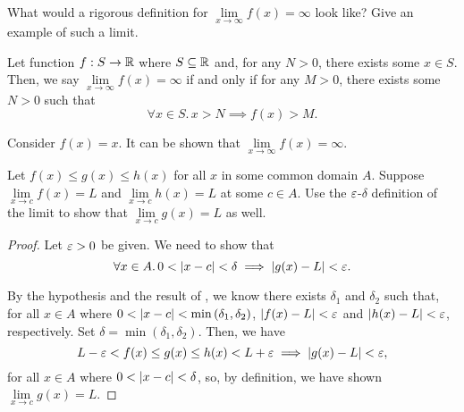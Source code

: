 \begin{problem}
  What would a rigorous definition for 
  $\lim\limits_{x \to \infty} f(x) = \infty$ look like? 
  Give an example of such a limit.

  \begin{definition}
    \label{def:limit-to-infty-x-to-infinite}
    Let function $f : S \to \mathbb{R}$ where $S \subseteq \mathbb{R}$ and, for any $N > 0$, there 
    exists some $x \in S$.
    Then, we say $\lim\limits_{x \to \infty} f(x) = \infty$ if and only if for any
    $M > 0$, there exists some $N > 0$ such that
    \[
      \forall x \in S.\, x > N \implies f(x) > M.
    \]
  \end{definition}

  Consider $f(x) = x$. It can be shown that $\lim\limits_{x \to \infty} f(x) = \infty$.

\end{problem}

\begin{problem}
  \label{prob:squeeze-theorem}
  Let $f(x) \leq g(x) \leq h(x)$ for all $x$ in some common domain $A$. Suppose $\lim\limits_{x \to c} f(x) = L$ and
  $\lim\limits_{x \to c} h(x) = L$ at some $c \in A$. Use the $\varepsilon$-$\delta$  definition of the limit
  to show  that $\lim\limits_{x \to c} g(x) = L$ as well.

  \begin{proof}
    Let $\varepsilon > 0$ be given. We need to show that
    \[
      \forall x \in A.\, 0 < \left\lvert x - c \right\rvert < \delta \implies \left\lvert g(x) - L \right\rvert < \varepsilon.
    \]

    By the hypothesis and the result of , we know there exists
    $\delta_{1}$ and $\delta_{2}$ such that, for all $x \in A$ where $0 < \left\lvert x - c \right\rvert < \min{(\delta_{1}, \delta_{2})}$,
    $\left\lvert f(x) - L \right\rvert < \varepsilon$ and $\left\lvert h(x) - L \right\rvert < \varepsilon$, respectively. Set $\delta = \min{(\delta_{1}, \delta_{2})}$. 
    Then, we have
    \[
      L - \varepsilon < f(x) \leq g(x) \leq h(x) < L + \varepsilon \implies \left\lvert g(x) - L \right\rvert < \varepsilon,
    \]
    for all $x \in A$ where $0 < \left\lvert x - c \right\rvert < \delta$, so, by definition, we have 
    shown $\lim\limits_{x \to c} g(x) = L$.
  \end{proof}
  
\end{problem}
